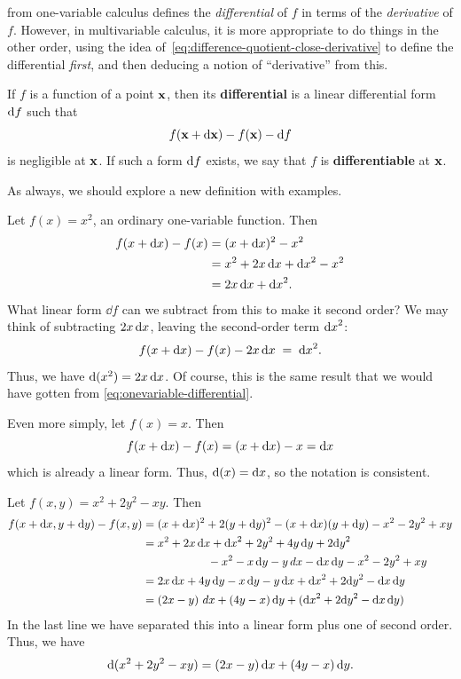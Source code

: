 \documentclass[12pt]{amsart}
\begin{document}
 from one-variable calculus defines the \emph{differential} of $f$ in terms of the \emph{derivative} of $f$.
However, in multivariable calculus, it is more appropriate to do things in the other order, using the idea of~\cref{eq:difference-quotient-close-derivative} to define the differential \emph{first}, and then deducing a notion of ``derivative'' from this.

\begin{defn}\label{def:differential}
  If $f$ is a function of a point $\mathbf{x}$, then its \textbf{differential} is a linear differential form ${\mathrm{d} f}$ such that
  \[ f(\mathbf{x} + \mathrm{d}\mathbf{x}) - f(\mathbf{x}) - {\mathrm{d} f} \]
  is negligible at $\mathbf{x}$.
  If such a form ${\mathrm{d} f}$ exists, we say that $f$ is \textbf{differentiable} at $\mathbf{x}$.
\end{defn}

As always, we should explore a new definition with examples.

\begin{eg}
  Let $f(x) = x^2$, an ordinary one-variable function.
  Then
  \begin{align*}
    f(x + {\mathrm{d} x}) - f(x) &= (x+{\mathrm{d} x})^2 - x^2\\
    &= x^2 + 2 x \, {\mathrm{d} x} + {\mathrm{d} x}^2 - x^2\\
    &= 2x \, {\mathrm{d} x} + {\mathrm{d} x} ^2.
  \end{align*}
  What linear form $\dd f$ can we subtract from this to make it second order?
  We may think of subtracting $2x \, {\mathrm{d} x}$, leaving the second-order term ${\mathrm{d} x}^2$:
  \[ f(x + {\mathrm{d} x}) - f(x) - 2x \, {\mathrm{d} x} \;=\; {\mathrm{d} x}^2. \]
  Thus, we have $\mathrm{d}(x^2) = 2 x \, {\mathrm{d} x}$.
  Of course, this is the same result that we would have gotten from \cref{eq:onevariable-differential}.
\end{eg}

\begin{eg}
  Even more simply, let $f(x) = x$.
  Then
  \[f(x+{\mathrm{d} x}) - f(x) = (x+{\mathrm{d} x})-x = {\mathrm{d} x} \]
  which is already a linear form.
  Thus, $\mathrm{d}(x) = {\mathrm{d} x}$, so the notation is consistent.
\end{eg}

\begin{eg}
  Let $f(x,y) = x^2 + 2y^2 - xy$.
  Then
  \begin{align*}
    f(x+{\mathrm{d} x},y+{\mathrm{d} y}) - f(x,y)
    &= (x+{\mathrm{d} x})^2 + 2(y+{\mathrm{d} y})^2 - (x+{\mathrm{d} x})(y+{\mathrm{d} y}) - x^2 - 2y^2 + xy\\
    &= x^2 + 2 x \, {\mathrm{d} x} + {\mathrm{d} x}^2 + 2y^2 + 4y\,{\mathrm{d} y} + 2{\mathrm{d} y}^2\\
    & \hspace{2cm} - x^2 - x \, {\mathrm{d} y} - y \, dx - {\mathrm{d} x}\, {\mathrm{d} y} - x^2 - 2y^2 + xy\\
    &= 2x\,{\mathrm{d} x} + 4y\,{\mathrm{d} y} - x\,{\mathrm{d} y} - y\,{\mathrm{d} x} + {\mathrm{d} x}^2 + 2{\mathrm{d} y}^2 - {\mathrm{d} x}\,{\mathrm{d} y}\\
    &= (2x-y)\,\,dx + (4y-x)\,{\mathrm{d} y} + ({\mathrm{d} x}^2 + 2{\mathrm{d} y}^2 - {\mathrm{d} x}\,{\mathrm{d} y})
  \end{align*}
  In the last line we have separated this into a linear form plus one of second order.
  Thus, we have
  \[ \mathrm{d}(x^2 + 2y^2 - xy) = (2x-y)\,{\mathrm{d} x} + (4y-x)\,{\mathrm{d} y} .\]
\end{eg}
\end{document}
